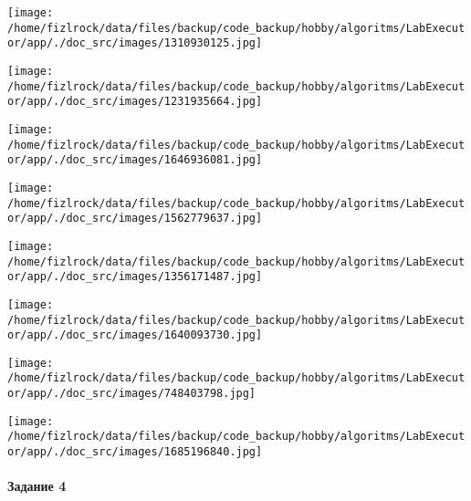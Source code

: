 \documentclass[a4paper, 12pt]{article}
\begin{document}
\texttt{[image: /home/fizlrock/data/files/backup/code\_backup/hobby/algoritms/LabExecutor/app/./doc\_src/images/1310930125.jpg]}

\texttt{[image: /home/fizlrock/data/files/backup/code\_backup/hobby/algoritms/LabExecutor/app/./doc\_src/images/1231935664.jpg]}

\texttt{[image: /home/fizlrock/data/files/backup/code\_backup/hobby/algoritms/LabExecutor/app/./doc\_src/images/1646936081.jpg]}

\texttt{[image: /home/fizlrock/data/files/backup/code\_backup/hobby/algoritms/LabExecutor/app/./doc\_src/images/1562779637.jpg]}

\texttt{[image: /home/fizlrock/data/files/backup/code\_backup/hobby/algoritms/LabExecutor/app/./doc\_src/images/1356171487.jpg]}

\texttt{[image: /home/fizlrock/data/files/backup/code\_backup/hobby/algoritms/LabExecutor/app/./doc\_src/images/1640093730.jpg]}

\texttt{[image: /home/fizlrock/data/files/backup/code\_backup/hobby/algoritms/LabExecutor/app/./doc\_src/images/748403798.jpg]}

\texttt{[image: /home/fizlrock/data/files/backup/code\_backup/hobby/algoritms/LabExecutor/app/./doc\_src/images/1685196840.jpg]}
\pagebreak
\paragraph{Задание 4}
\end{document}

